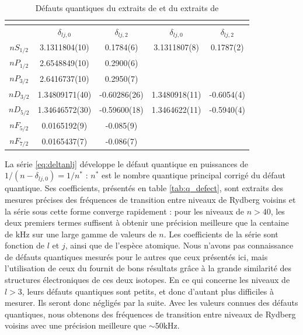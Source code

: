 \begin{table}[tph!]
	\centering
	\caption[Défauts quantiques du $^{87}Rb$ et $^{85}Rb$]{Défauts quantiques  du  extraits de \cite{MX_GALLAGHERSPECRBNSND03, MX_GALLAGHERSPECRBNF06} et du  extraits de \cite{MX_MACKNSNDRYD}}
	\label{tab:q_defect}
	\begin{tabular}{ c S[table-format=1.12]S[table-format=2.8]  S[table-format=1.10]S[table-format=2.6]}
		\toprule\midrule
		 &  	&     \\ 
		 \midrule
				  &		$\delta_{lj,0}$				&	$\delta_{lj,2}$		&	$\delta_{lj,0}$			&	$\delta_{lj,2}$ \\ 
		\midrule
		$nS_{1/2}$&  	3.1311804(10)		&	0.1784(6) 	& 3.1311807(8)	& 0.1787(2)	\\
		$nP_{1/2}$&  	2.6548849(10)		&	0.2900(6)	&						&				\\
		$nP_{3/2}$&  	2.6416737(10)		&	0.2950(7)	&						&				\\
		$nD_{3/2}$&  	1.34809171(40)	&	-0.60286(26)&1.3480918(11)	&	-0.6054(4)	\\
		$nD_{5/2}$&  	1.34646572(30)	&	-0.59600(18)&1.3464622(11)	&-0.5940(4)		\\
		$nF_{5/2}$&  	0.0165192(9)		&	-0.085(9)	&						&				\\
		$nF_{7/2}$&  	0.0165437(7)		&	-0.086(7)	&						&				\\
		\midrule
		\bottomrule
 	\end{tabular}
\end{table}
%
La série \eqref{eq:deltanlj} développe le défaut quantique en puissances de $1/(n-\delta_{lj,0}) = 1/n^*$ : $n^*$ est le nombre quantique principal corrigé du défaut quantique.
Ses coefficients, présentés en table \eqref{tab:q_defect}, sont extraits des mesures précises des fréquences de transition entre niveaux de Rydberg voisins \cite{ENS_SPECNA2,ENS_SPECCS,MX_MECHEDERYDSPECTRO87} et la série sous cette forme converge rapidement \cite{MX_MARTINSERIESSPECNA} :
pour les niveaux de $n>40$, les deux premiers termes suffisent à obtenir une précision meilleure que la centaine de $\si{\kilo\hertz}$ sur une large gamme de valeurs de $n$.
Les coefficients de la série sont fonction de $l$ et $j$, ainsi que de l'espèce atomique.
Nous n'avons pas connaissance de défauts quantiques mesurés pour le  autres que ceux présentés ici, mais l'utilisation de ceux du  fournit de bons résultats grâce à la grande similarité des structures électroniques de ces deux isotopes.
En ce qui concerne les niveaux de $l>3$, leurs défauts quantiques sont petits, et donc d'autant plus difficiles à mesurer. Ils seront donc négligés par la suite.
Avec les valeurs connues des défauts quantiques, nous obtenons des fréquences de transition entre niveaux de Rydberg voisins avec une précision meilleure que $\sim 50\si{\kilo\hertz}$.

